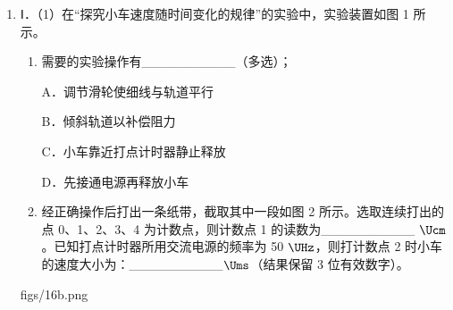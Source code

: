 \documentclass[\gkver]{gaokaozhenti}
\begin{document}
\begin{enumerate}
{A. 可知，图 1 中的 H$_{\alpha}$ 对应的是可见光 II，故 A 错误；

B. 由公式有，干涉条纹间距为

 $\Delta x = \lambda \frac{l}{d}$

由图可知，图 2 中间距较小，则波长较小，对应的是可见光 I，故 B 错误；

C. 根据题意，由公式可得，光子动量为

 $p = \frac{h\nu}{c} = \frac{h}{\lambda}$

可知，I 的光子动量大于 II 的光子动量，故 C 正确；

D. 根据光电效应方程及动能定理可得

 $eU_{c}=h\nu-W_{0}$

可知，频率越大，遏止电压越大，则 P 向 a 移动，电流表示数为零时 I 对应的电压表示数比 II 的大，故 D 正确。

故选 CD。
}

\item
Ⅰ．（1）在“探究小车速度随时间变化的规律”的实验中，实验装置如图 1 所示。
\begin{enumerate}[label=\protect\Circled{\arabic*}]
	\item
	需要的实验操作有\_\_\_\_\_\_\_\_\_\_（多选）；

	A．调节滑轮使细线与轨道平行

	B．倾斜轨道以补偿阻力

	C．小车靠近打点计时器静止释放

	D．先接通电源再释放小车
	\item
	经正确操作后打出一条纸带，截取其中一段如图 2 所示。选取连续打出的点 0、1、2、3、4 为计数点，则计数点 1 的读数为\_\_\_\_\_\_\_\_\_\_ $\Ucm$。已知打点计时器所用交流电源的频率为 50 $\UHz$，则打计数点 2 时小车的速度大小为：\_\_\_\_\_\_\_\_\_\_$\Ums$（结果保留 3 位有效数字）。
\end{enumerate}
{figs/16b.png}
\end{enumerate}
\end{document}
